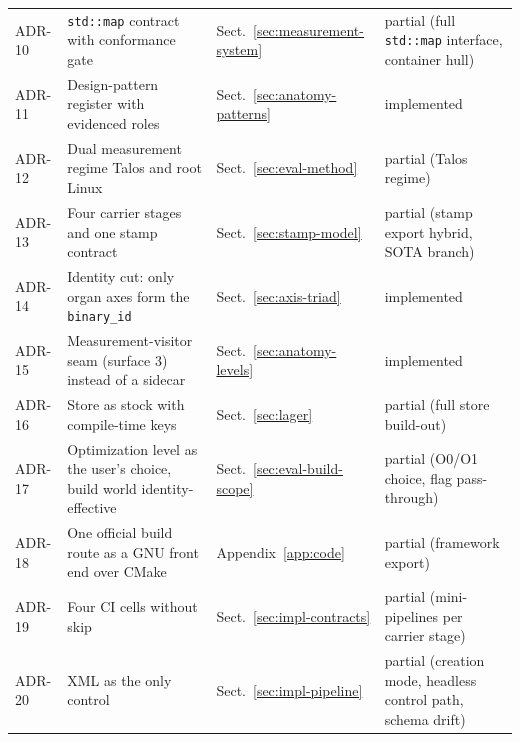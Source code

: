 \begin{footnotesize}
\begin{longtable}{@{}>{\raggedright\arraybackslash}p{1.3cm}>{\raggedright\arraybackslash}p{6.0cm}>{\raggedright\arraybackslash}p{3.3cm}>{\raggedright\arraybackslash}p{3.8cm}@{}}
ADR-10 & \texttt{std::map} contract with conformance gate & Sect.~\ref{sec:measurement-system} & partial (full \texttt{std::map} interface, container hull) \\
ADR-11 & Design-pattern register with evidenced roles & Sect.~\ref{sec:anatomy-patterns} & implemented \\
ADR-12 & Dual measurement regime Talos and root Linux & Sect.~\ref{sec:eval-method} & partial (Talos regime) \\
ADR-13 & Four carrier stages and one stamp contract & Sect.~\ref{sec:stamp-model} & partial (stamp export hybrid, SOTA branch) \\
ADR-14 & Identity cut: only organ axes form the \texttt{binary\_id} & Sect.~\ref{sec:axis-triad} & implemented \\
ADR-15 & Measurement-visitor seam (surface 3) instead of a sidecar & Sect.~\ref{sec:anatomy-levels} & implemented \\
ADR-16 & Store as stock with compile-time keys & Sect.~\ref{sec:lager} & partial (full store build-out) \\
ADR-17 & Optimization level as the user's choice, build world identity-effective & Sect.~\ref{sec:eval-build-scope} & partial (O0/O1 choice, flag pass-through) \\
ADR-18 & One official build route as a GNU front end over CMake & Appendix~\ref{app:code} & partial (framework export) \\
ADR-19 & Four CI cells without skip & Sect.~\ref{sec:impl-contracts} & partial (mini-pipelines per carrier stage) \\
ADR-20 & XML as the only control & Sect.~\ref{sec:impl-pipeline} & partial (creation mode, headless control path, schema drift) \\
\end{longtable}
\end{footnotesize}

